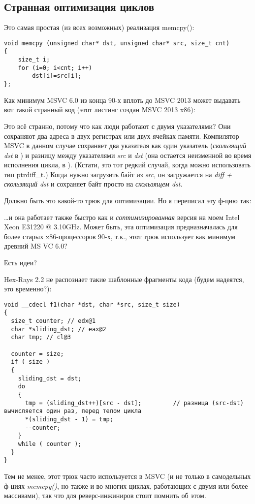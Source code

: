 \subsection{Странная оптимизация циклов}

Это самая простая (из всех возможных) реализация memcpy():

\begin{lstlisting}[style=customc]
void memcpy (unsigned char* dst, unsigned char* src, size_t cnt)
{
	size_t i;
	for (i=0; i<cnt; i++)
		dst[i]=src[i];
};
\end{lstlisting}

Как минимум MSVC 6.0 из конца 90-х вплоть до MSVC 2013 может выдавать вот такой странный код (этот листинг создан MSVC 2013
x86):



Это всё странно, потому что как люди работают с двумя указателями? Они сохраняют два адреса в двух регистрах или двух
ячейках памяти.
Компилятор MSVC в данном случае сохраняет два указателя как один указатель (\emph{скользящий dst} в \EAX)
и разницу между указателями \emph{src} и \emph{dst} (она остается неизменной во время исполнения цикла, в \ESI).
(Кстати, это тот редкий случай, когда можно использовать тип ptrdiff\_t.)
Когда нужно загрузить байт из \emph{src}, он загружается на \emph{diff + скользящий dst} и сохраняет байт просто на
\emph{скользящем dst}.

Должно быть это какой-то трюк для оптимизации. Но я переписал эту ф-цию так:



\dots и она работает также быстро как и \emph{соптимизированная} версия на моем Intel Xeon E31220 @ 3.10GHz.
Может быть, эта оптимизация предназначалась для более старых x86-процессоров 90-х, т.к., этот трюк использует
как минимум древний MS VC 6.0?

Есть идеи?

Hex-Rays 2.2 не распознает такие шаблонные фрагменты кода (будем надеятся, это временно?):

\begin{lstlisting}[style=customc]
void __cdecl f1(char *dst, char *src, size_t size)
{
  size_t counter; // edx@1
  char *sliding_dst; // eax@2
  char tmp; // cl@3

  counter = size;
  if ( size )
  {
    sliding_dst = dst;
    do
    {
      tmp = (sliding_dst++)[src - dst];         // разница (src-dst) вычисляется один раз, перед телом цикла
      *(sliding_dst - 1) = tmp;
      --counter;
    }
    while ( counter );
  }
}
\end{lstlisting}

Тем не менее, этот трюк часто используется в MSVC (и не только в самодельных ф-циях \emph{memcpy()}, но также и во многих
циклах, работающих с двумя или более массивами), так что для реверс-инжиниров стоит помнить об этом.


